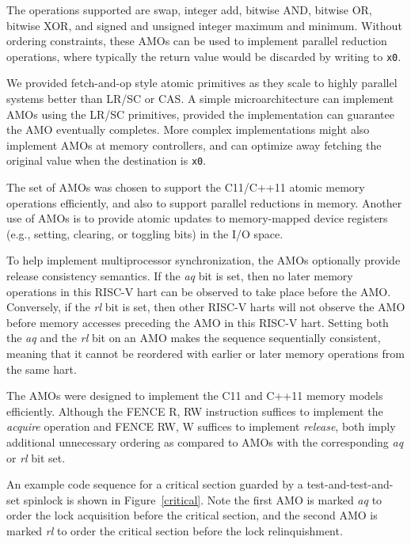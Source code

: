 The operations supported are swap, integer add, bitwise AND, bitwise
OR, bitwise XOR, and signed and unsigned integer maximum and minimum.
Without ordering constraints, these AMOs can be used to implement
parallel reduction operations, where typically the return value would
be discarded by writing to {\tt x0}.

\begin{commentary}
We provided fetch-and-op style atomic primitives as they scale to
highly parallel systems better than LR/SC or CAS.
A simple microarchitecture can implement AMOs using the LR/SC primitives,
provided the implementation can guarantee the AMO eventually completes.
More complex implementations might also implement AMOs at memory
controllers, and can optimize away fetching the original value when
the destination is {\tt x0}.

The set of AMOs was chosen to support the C11/C++11 atomic memory
operations efficiently, and also to support parallel reductions in
memory.  Another use of AMOs is to provide atomic updates to
memory-mapped device registers (e.g., setting, clearing, or toggling
bits) in the I/O space.
\end{commentary}

To help implement multiprocessor synchronization, the AMOs optionally
provide release consistency semantics.  If the {\em aq} bit is set,
then no later memory operations in this RISC-V hart can be observed
to take place before the AMO.
Conversely, if the {\em rl} bit is set, then other
RISC-V harts will not observe the AMO before memory accesses
preceding the AMO in this RISC-V hart.  Setting both the {\em aq} and the {\em
rl} bit on an AMO makes the sequence sequentially consistent, meaning that
it cannot be reordered with earlier or later memory operations from the same
hart.

\begin{commentary}
The AMOs were designed to implement the C11 and C++11 memory models
efficiently.  Although the FENCE R, RW instruction suffices to
implement the {\em acquire} operation and FENCE RW, W suffices to
implement {\em release}, both imply additional unnecessary ordering as
compared to AMOs with the corresponding {\em aq} or {\em rl} bit set.
\end{commentary}

An example code sequence for a critical section guarded by a
test-and-test-and-set spinlock is shown in Figure~\ref{critical}.  Note the
first AMO is marked {\em aq} to order the lock acquisition before the
critical section, and the second AMO is marked {\em rl} to order
the critical section before the lock relinquishment.

